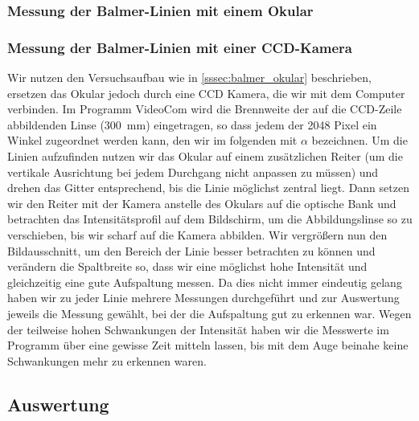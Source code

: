 \documentclass[11pt, a4paper]{article}
\numberwithin{equation}{section}
\begin{document}
\subsubsection{Messung der Balmer-Linien mit einem Okular} 

\subsubsection{Messung der Balmer-Linien mit einer CCD-Kamera}
Wir nutzen den Versuchsaufbau wie in \ref{sssec:balmer_okular} beschrieben, ersetzen das Okular jedoch durch eine CCD Kamera, die wir mit dem Computer verbinden.
Im Programm VideoCom wird die Brennweite der auf die CCD-Zeile abbildenden Linse (\SI{300}{\milli\meter}) eingetragen, so dass jedem der 2048 Pixel ein Winkel zugeordnet werden kann, den wir im folgenden mit $\alpha$ bezeichnen.
Um die Linien aufzufinden nutzen wir das Okular auf einem zusätzlichen Reiter (um die vertikale Ausrichtung bei jedem Durchgang nicht anpassen zu müssen) und drehen das Gitter entsprechend, bis die Linie möglichst zentral liegt.
Dann setzen wir den Reiter mit der Kamera anstelle des Okulars auf die optische Bank und betrachten das Intensitätsprofil auf dem Bildschirm, um die Abbildungslinse so zu verschieben, bis wir scharf auf die Kamera abbilden.
Wir vergrößern nun den Bildausschnitt, um den Bereich der Linie besser betrachten zu können und verändern die Spaltbreite so, dass wir eine möglichst hohe Intensität und gleichzeitig eine gute Aufspaltung messen.
Da dies nicht immer eindeutig gelang haben wir zu jeder Linie mehrere Messungen durchgeführt und zur Auswertung jeweils die Messung gewählt, bei der die Aufspaltung gut zu erkennen war.
Wegen der teilweise hohen Schwankungen der Intensität haben wir die Messwerte im Programm über eine gewisse Zeit mitteln lassen, bis mit dem Auge beinahe keine Schwankungen mehr zu erkennen waren.

\subsection{Auswertung}
\end{document}

